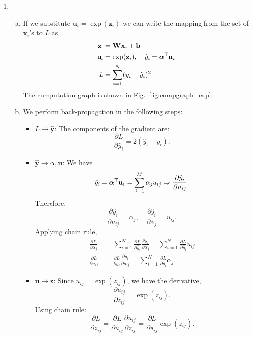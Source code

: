 \documentclass[11pt]{article}
\def\arr{\rightarrow}
\newcommand{\bbf}{\mathbf{b}}
\newcommand{\ubf}{\mathbf{u}}
\newcommand{\xbf}{\mathbf{x}}
\newcommand{\ybf}{\mathbf{y}}
\newcommand{\zbf}{\mathbf{z}}
\newcommand{\Wbf}{\mathbf{W}}
\def\alphabf{{\boldsymbol \alpha}}
\newcommand{\tran}{^{\text{\sf T}}}
\begin{document}
\begin{enumerate}
\item

\begin{enumerate}[(a)]
\item If we substitute $\ubf_i = \exp(\zbf_i)$ we can write the mapping from
the set of $\xbf_i$'s to $L$ as
\begin{align*}
    \zbf_i    &= \Wbf\xbf_i + \bbf \\
    \ubf_i &= \exp(\zbf_i), \quad \hat{y}_i = \alphabf\tran \ubf_i \\
    L &= \sum_{i=1}^N (y_i-\hat{y}_i)^2.
\end{align*}
The computation graph is shown in Fig.~\ref{fig:compgraph_exp}.

\item We perform back-propagation in the following steps:
\begin{itemize}
\item $L \arr \hat{\ybf}$:  The components of the gradient are:
\[
    \frac{\partial L}{\partial \hat{y}_i} = 2(\hat{y}_i - y_i).
\]

\item $\hat{\ybf} \arr \alphabf, \ubf$:  We have
\[
    \hat{y}_i = \alphabf\tran \ubf_i = \sum_{j=1}^M \alpha_ju_{ij} \Rightarrow
    \frac{\partial \hat{y}_i}{\partial u_{ij}}.
\]
Therefore,
\[
    \frac{\partial \hat{y}_i}{\partial u_{ij}} = \alpha_j, \quad 
    \frac{\partial \hat{y}_i}{\partial \alpha_j} = u_{ij}.
\]
Applying chain rule,
\begin{align*}
    \frac{\partial L}{\partial \alpha_j} &= \sum_{i=1}^N 
    \frac{\partial L}{\partial \hat{y}_i}\frac{\partial \hat{y}_i}{\partial \alpha_j}
    = \sum_{i=1}^N  \frac{\partial L}{\partial \hat{y}_i}u_{ij} \\
    \frac{\partial L}{\partial u_{ij}} &= 
    \frac{\partial L}{\partial \hat{y}_i}\frac{\partial \hat{y}_i}{\partial u_{ij}}
    = \sum_{i=1}^N  \frac{\partial L}{\partial \hat{y}_i}\alpha_j.
\end{align*}

\item $\ubf \arr \zbf$: Since $u_{ij} = \exp(z_{ij})$, we have the derivative,
\[
    \frac{\partial u_{ij}}{\partial z_{ij}} = \exp(z_{ij}).
\]
Using chain rule:
\[
    \frac{\partial L}{\partial z_{ij}} = \frac{\partial L}{\partial u_{ij}}\frac{\partial u_{ij}}{\partial z_{ij}}
    = \frac{\partial L}{\partial u_{ij}}\exp(z_{ij}).
\]


\end{itemize}
\end{enumerate}
\end{enumerate}
\end{document}

